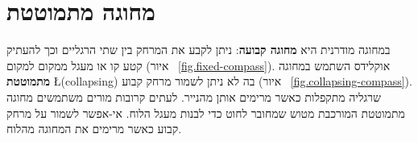 
\chapter{מחוגה מתמוטטת}\label{c.collapse}


\vspace*{-2ex}

במחוגה מודרנית היא 
\textbf{מחוגה קבועה}:
ניתן לקבע את המרחק בין שתי הרגליים וכך להעתיק קטע קו או מעגל ממקום למקום (איור%
~\ref{fig.fixed-compass}).
אוקלידס השתמש במחוגה 
\textbf{מתמוטטת}
\L{(collapsing)}
בה לא ניתן לשמור מרחק קבוע (איור%
~\ref{fig.collapsing-compass}).
שרגליה מתקפלות כאשר מרימים אותן מהנייר. לעתים קרובות מורים משתמשים מחוגה מתמוטטת המורכבת מטוש שמחובר לחוט כדי לבנות מעגל הלוח. אי-אפשר לשמור על מרחק קבוע כאשר מרימים את המחוגה מהלוח.

